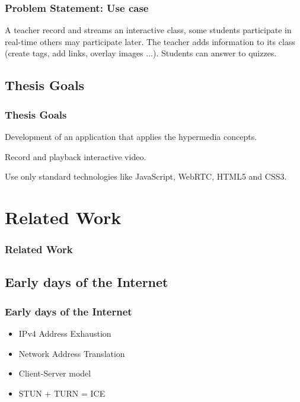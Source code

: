 \documentclass[compress]{beamer}
\begin{document}
  		\begin{frame}[c]
		\frametitle{Problem Statement: Use case}
		A teacher record and streams an interactive class, some students participate in real-time others may participate later.
		\vfill
		The teacher adds information to its class (create tags, add links, overlay images ...).
		\vfill
		Students can answer to quizzes.
		\end{frame}



		
	

	\subsection{Thesis Goals} %
  		\begin{frame}[c]
		\frametitle{Thesis Goals}
		Development of an application that applies the hypermedia concepts.

		\vfill
		
		Record and playback interactive video.
		
		\vfill

		Use only standard technologies like JavaScript, WebRTC, HTML5 and CSS3.

		\end{frame}


\section{Related Work}\label{related}

\begin{frame}[t,shrink]
\frametitle{Related Work} 

\end{frame}

	\subsection{Early days of the Internet}\label{early}


  		\begin{frame}[c]
		\frametitle{Early days of the Internet}
		\begin{itemize}
		\item IPv4 Address Exhaustion
		\vfill
		\item Network Address Translation	
		\vfill
		\item Client-Server model
		\vfill
		\item STUN + TURN = ICE
		\end{itemize}
		\end{frame}
\end{document}
